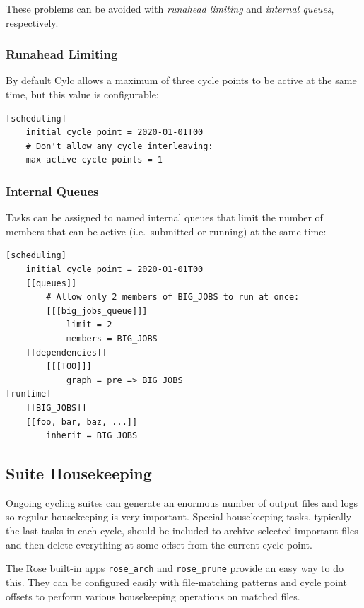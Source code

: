 These problems can be avoided with {\em runahead limiting} and {\em internal
queues}, respectively.

\subsubsection{Runahead Limiting}
\label{Runahead Limiting}

By default Cylc allows a maximum of three cycle points to be active at the same
time, but this value is configurable:

\lstset{language=suiterc}
\begin{lstlisting}
[scheduling]
    initial cycle point = 2020-01-01T00
    # Don't allow any cycle interleaving:
    max active cycle points = 1
\end{lstlisting}

\subsubsection{Internal Queues}

Tasks can be assigned to named internal queues that limit the number of members
that can be active (i.e.\ submitted or running) at the same time:

\lstset{language=suiterc}
\begin{lstlisting}
[scheduling]
    initial cycle point = 2020-01-01T00
    [[queues]]
        # Allow only 2 members of BIG_JOBS to run at once:
        [[[big_jobs_queue]]]
            limit = 2
            members = BIG_JOBS
    [[dependencies]]
        [[[T00]]]
            graph = pre => BIG_JOBS
[runtime]
    [[BIG_JOBS]]
    [[foo, bar, baz, ...]]
        inherit = BIG_JOBS
\end{lstlisting}

\subsection{Suite Housekeeping}
\label{Suite Housekeeping}

Ongoing cycling suites can generate an enormous number of output files and logs
so regular housekeeping is very important. Special housekeeping tasks,
typically the last tasks in each cycle, should be included to archive selected
important files and then delete everything at some offset from the current
cycle point.

The Rose built-in apps \lstinline=rose_arch= and \lstinline=rose_prune=
provide an easy way to do this. They can be configured easily with
file-matching patterns and cycle point offsets to perform various housekeeping
operations on matched files.

